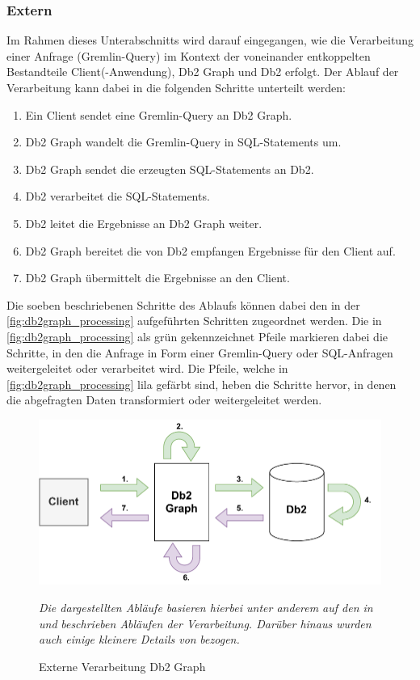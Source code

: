 \subsubsection{Extern}
Im Rahmen dieses Unterabschnitts wird darauf eingegangen, wie die Verarbeitung einer Anfrage (Gremlin-Query) im Kontext der voneinander entkoppelten Bestandteile Client(-Anwendung), Db2 Graph und Db2 erfolgt. Der Ablauf der  Verarbeitung kann dabei in die folgenden Schritte unterteilt werden: 
\begin{enumerate}
    \item Ein Client sendet eine Gremlin-Query an Db2 Graph. 
    \item Db2 Graph wandelt die Gremlin-Query in SQL-Statements um. 
    \item Db2 Graph sendet die erzeugten SQL-Statements an Db2.
    \item Db2 verarbeitet die SQL-Statements.
    \item Db2 leitet die Ergebnisse an Db2 Graph weiter.
    \item Db2 Graph bereitet die von Db2 empfangen Ergebnisse für den Client auf. 
    \item Db2 Graph übermittelt die Ergebnisse an den Client.
\end{enumerate}

Die soeben beschriebenen Schritte des Ablaufs können dabei den in der \autoref{fig:db2graph_processing} aufgeführten Schritten zugeordnet werden. Die in \autoref{fig:db2graph_processing} als grün gekennzeichnet Pfeile markieren dabei die Schritte, in den die Anfrage in Form einer Gremlin-Query oder SQL-Anfragen weitergeleitet oder verarbeitet wird. Die Pfeile, welche in \autoref{fig:db2graph_processing} lila gefärbt sind, heben die Schritte hervor, in denen die abgefragten Daten transformiert oder weitergeleitet werden.

\begin{figure}[ht]
    \centering
    \includegraphics[width=\textwidth]{images/db2graph_processing.pdf}
    \caption{Externe Verarbeitung Db2 Graph}
    \label{fig:db2graph_processing}
    \vspace{1em}
    \textit{Die dargestellten Abläufe basieren hierbei unter anderem auf den in} \cite{vldb_tian} \textit{und} \cite{sigmod_tian} \textit{beschrieben Abläufen der Verarbeitung. Darüber hinaus wurden auch einige kleinere Details von} \cite{tinkerpop_2020} \textit{bezogen.} 
\end{figure}

